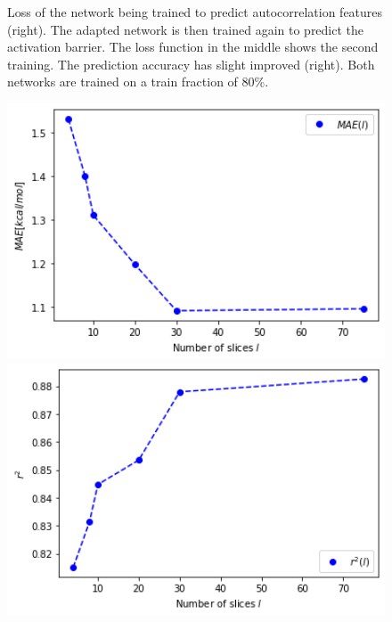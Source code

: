 \begin{figure}[b]
    \endminipage
    \caption[LEFD transfer learning]{
    Loss of the network being trained to predict autocorrelation features (right).
    The adapted network is then trained again to predict the activation barrier. The loss function in the middle shows the second training.
    The prediction accuracy has slight improved (right).  
    Both networks are trained on a train fraction of 80\%.
    }
    \label{fig:transfer_final}
\end{figure}

\begin{figure}[H]
      \includegraphics[width=1.0\textwidth]{figures/regression/fourier/mae_layer.png}
    \endminipage\hfill
      \includegraphics[width=1.0\textwidth]{figures/regression/fourier/r2_layer.png}
    \endminipage\hfill

\end{figure}
